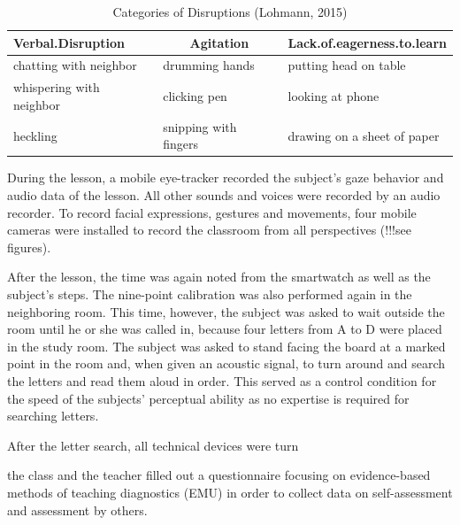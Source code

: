 \documentclass[
  man,floatsintext]{apa6}
\begin{document}
\begin{table}[h]

\begin{center}
\begin{threeparttable}

\caption{\label{tab:disruption_categories}Categories of Disruptions (Lohmann, 2015)}

\tiny{

\begin{tabular}{lll}
\toprule
Verbal.Disruption & \multicolumn{1}{c}{Agitation} & \multicolumn{1}{c}{Lack.of.eagerness.to.learn}\\
\midrule
chatting with neighbor & drumming hands & putting head on table\\
whispering with neighbor & clicking pen & looking at phone\\
heckling & snipping with fingers & drawing on a sheet of paper\\
\bottomrule
\end{tabular}

}

\end{threeparttable}
\end{center}

\end{table}

During the lesson, a mobile eye-tracker recorded the subject's gaze behavior and audio data of the lesson. All other sounds and voices were recorded by an audio recorder. To record facial expressions, gestures and movements, four mobile cameras were installed to record the classroom from all perspectives (!!!see figures).

After the lesson, the time was again noted from the smartwatch as well as the subject's steps. The nine-point calibration was also performed again in the neighboring room. This time, however, the subject was asked to wait outside the room until he or she was called in, because four letters from A to D were placed in the study room. The subject was asked to stand facing the board at a marked point in the room and, when given an acoustic signal, to turn around and search the letters and read them aloud in order. This served as a control condition for the speed of the subjects' perceptual ability as no expertise is required for searching letters.

After the letter search, all technical devices were turn

the class and the teacher filled out a questionnaire focusing on evidence-based methods of teaching diagnostics (EMU) in order to collect data on self-assessment and assessment by others.
\end{document}
